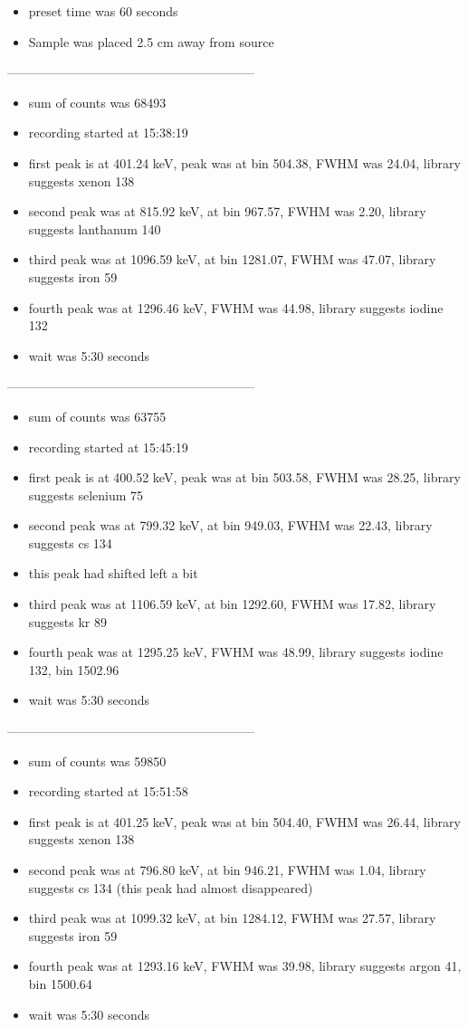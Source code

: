\documentclass[a4paper]{article}
\begin{document}
\begin{itemize}
    \item preset time was 60 seconds
    \item Sample was placed 2.5 cm away from source
\end{itemize}
-----------------------------------------------------------
\begin{itemize}
    \item sum of counts was 68493 
    \item recording started at 15:38:19
    \item first peak is at 401.24 keV, peak was at bin 504.38, FWHM was 24.04, library suggests xenon 138
    \item second peak was at 815.92 keV, at bin 967.57, FWHM was 2.20, library suggests lanthanum 140
    \item third peak was at 1096.59 keV, at bin 1281.07, FWHM was 47.07, library suggests iron 59
    \item fourth peak was at 1296.46 keV, FWHM was 44.98, library suggests iodine 132
    \item wait was 5:30 seconds
\end{itemize}
-----------------------------------------------------------
\begin{itemize}
    \item sum of counts was 63755
    \item recording started at 15:45:19
    \item first peak is at 400.52 keV, peak was at bin 503.58, FWHM was 28.25, library suggests selenium 75
    \item second peak was at 799.32 keV, at bin 949.03, FWHM was 22.43, library suggests cs 134
    \item this peak had shifted left a bit
    \item third peak was at 1106.59 keV, at bin 1292.60, FWHM was 17.82, library suggests kr 89
    \item fourth peak was at 1295.25 keV, FWHM was 48.99, library suggests iodine 132, bin 1502.96
    \item wait was 5:30 seconds
\end{itemize}
-----------------------------------------------------------
\begin{itemize}
    \item sum of counts was 59850
    \item recording started at 15:51:58
    \item first peak is at 401.25 keV, peak was at bin 504.40, FWHM was 26.44, library suggests xenon 138
    \item second peak was at 796.80 keV, at bin 946.21, FWHM was 1.04, library suggests cs 134 (this peak had almost disappeared)
    \item third peak was at 1099.32 keV, at bin 1284.12, FWHM was 27.57, library suggests iron 59
    \item fourth peak was at 1293.16 keV, FWHM was 39.98, library suggests argon 41, bin 1500.64
    \item wait was 5:30 seconds
\end{itemize}
\end{document}
